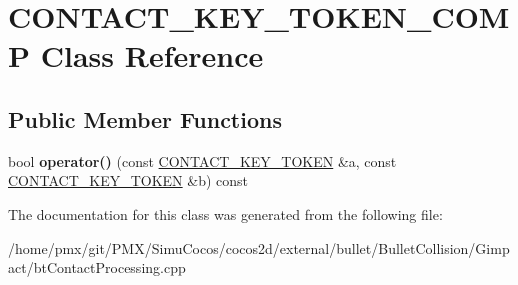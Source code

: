 \hypertarget{classCONTACT__KEY__TOKEN__COMP}{}\section{C\+O\+N\+T\+A\+C\+T\+\_\+\+K\+E\+Y\+\_\+\+T\+O\+K\+E\+N\+\_\+\+C\+O\+MP Class Reference}
\label{classCONTACT__KEY__TOKEN__COMP}
\subsection*{Public Member Functions}
\begin{DoxyCompactItemize}
\item 
\mbox{\label{classCONTACT__KEY__TOKEN__COMP_a479c219aa44645aeb369d93581522f30}} 
bool {\bfseries operator()} (const \hyperlink{structCONTACT__KEY__TOKEN}{C\+O\+N\+T\+A\+C\+T\+\_\+\+K\+E\+Y\+\_\+\+T\+O\+K\+EN} \&a, const \hyperlink{structCONTACT__KEY__TOKEN}{C\+O\+N\+T\+A\+C\+T\+\_\+\+K\+E\+Y\+\_\+\+T\+O\+K\+EN} \&b) const
\end{DoxyCompactItemize}


The documentation for this class was generated from the following file\+:\begin{DoxyCompactItemize}
\item 
/home/pmx/git/\+P\+M\+X/\+Simu\+Cocos/cocos2d/external/bullet/\+Bullet\+Collision/\+Gimpact/bt\+Contact\+Processing.\+cpp\end{DoxyCompactItemize}
